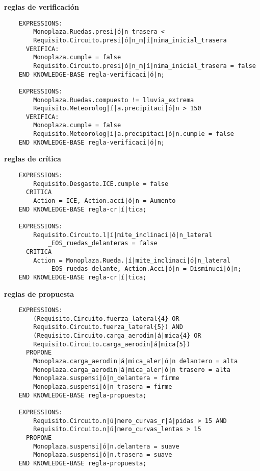 \documentclass[12pt,a4paper,twoside,spanish]{article}      %
\begin{document}
\textbf{reglas de verificación}
\begin{lstlisting}
    EXPRESSIONS:
        Monoplaza.Ruedas.presi|ó|n_trasera <
        Requisito.Circuito.presi|ó|n_m|í|nima_inicial_trasera
      VERIFICA:
        Monoplaza.cumple = false
        Requisito.Circuito.presi|ó|n_m|í|nima_inicial_trasera = false
    END KNOWLEDGE-BASE regla-verificaci|ó|n;

    EXPRESSIONS:
        Monoplaza.Ruedas.compuesto != lluvia_extrema
        Requisito.Meteorolog|í|a.precipitaci|ó|n > 150
      VERIFICA:
        Monoplaza.cumple = false
        Requisito.Meteorolog|í|a.precipitaci|ó|n.cumple = false
    END KNOWLEDGE-BASE regla-verificaci|ó|n;
\end{lstlisting}

\textbf{reglas de crítica}
\begin{lstlisting}
    EXPRESSIONS:
        Requisito.Desgaste.ICE.cumple = false
      CRITICA
        Action = ICE, Action.acci|ó|n = Aumento
    END KNOWLEDGE-BASE regla-cr|í|tica;

    EXPRESSIONS:
        Requisito.Circuito.l|í|mite_inclinaci|ó|n_lateral
            _EOS_ruedas_delanteras = false
      CRITICA
        Action = Monoplaza.Rueda.|í|mite_inclinaci|ó|n_lateral
            _EOS_ruedas_delante, Action.Acci|ó|n = Disminuci|ó|n;
    END KNOWLEDGE-BASE regla-cr|í|tica;
\end{lstlisting}

\newpage
\textbf{reglas de propuesta}
\begin{lstlisting}
    EXPRESSIONS:
        (Requisito.Circuito.fuerza_lateral{4} OR
        Requisito.Circuito.fuerza_lateral{5}) AND
        (Requisito.Circuito.carga_aerodin|á|mica{4} OR
        Requisito.Circuito.carga_aerodin|á|mica{5})
      PROPONE
        Monoplaza.carga_aerodin|á|mica_aler|ó|n delantero = alta
        Monoplaza.carga_aerodin|á|mica_aler|ó|n trasero = alta 
        Monoplaza.suspensi|ó|n_delantera = firme
        Monoplaza.suspensi|ó|n_trasera = firme
    END KNOWLEDGE-BASE regla-propuesta;

    EXPRESSIONS:
        Requisito.Circuito.n|ú|mero_curvas_r|á|pidas > 15 AND
        Requisito.Circuito.n|ú|mero_curvas_lentas > 15
      PROPONE
        Monoplaza.suspensi|ó|n.delantera = suave
        Monoplaza.suspensi|ó|n.trasera = suave
    END KNOWLEDGE-BASE regla-propuesta;
\end{lstlisting}

\end{document}
